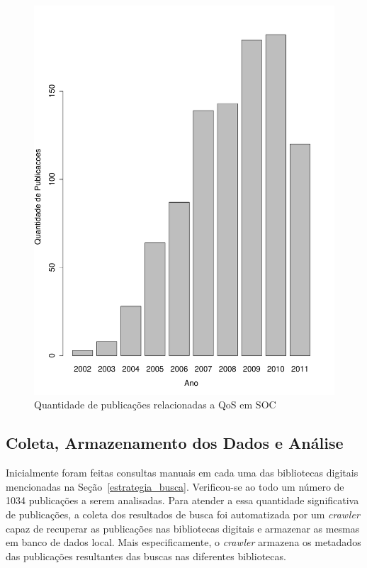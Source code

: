 \begin{figure}[htb]
\centering
\includegraphics[scale=0.5]{imagens/barplotAnoQuantidadePublicacoes.pdf}
\caption{Quantidade de publica\c c\~{o}es relacionadas a QoS em SOC}
\label{fig:barplotAnoPublicacoes}
\end{figure}

\subsection{Coleta, Armazenamento dos Dados e Análise}

Inicialmente foram feitas consultas manuais em cada uma das bibliotecas digitais mencionadas na Se\c c\~{a}o~\ref{estrategia_busca}. Verificou-se ao todo um número de 1034 publicações a serem analisadas. Para atender a essa quantidade significativa de publica\c c\~{o}es, a coleta dos resultados de busca foi automatizada por um \emph{crawler} capaz de recuperar as publica\c c\~{o}es nas bibliotecas digitais e armazenar as mesmas 
em banco de dados local. Mais especificamente, o \emph{crawler} armazena os metadados das publicações resultantes das buscas nas diferentes bibliotecas.

